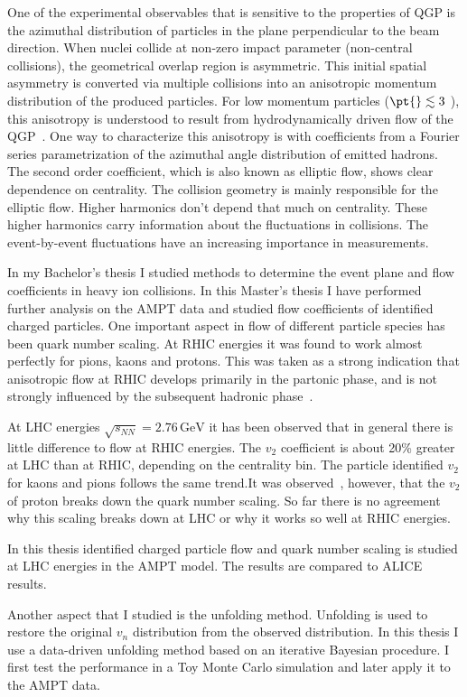 One of the experimental observables that is sensitive to the properties of QGP is the azimuthal distribution of particles in the plane perpendicular to the beam direction. 
When nuclei collide at non-zero impact parameter (non-central collisions), the geometrical overlap region is asymmetric. This initial spatial asymmetry is converted via multiple collisions into an anisotropic momentum distribution of the produced particles. For low momentum particles ($\pt{} \lesssim 3$ \gevc), this anisotropy is understood to result from hydrodynamically driven flow of the QGP~\cite{Adcox:2004mh, Adams:2005dq, Ollitrault:1992, Heinz:2002, Shuryak:2009}. One way to characterize this anisotropy is with coefficients from a Fourier series parametrization of the azimuthal angle distribution of emitted hadrons. The second order coefficient, which is also known as elliptic flow, shows clear dependence on centrality. The collision geometry is mainly responsible for the elliptic flow. Higher harmonics don't depend that much on centrality. These higher harmonics carry information about the fluctuations in collisions. The event-by-event fluctuations have an increasing importance in measurements. 

In my Bachelor's thesis I  studied methods to determine the event plane and flow coefficients in heavy ion collisions. In this Master's thesis I have performed further analysis on the AMPT data and studied flow coefficients of identified charged particles. One important aspect in flow of different particle species has been quark number scaling. At RHIC energies it was found to work almost perfectly for pions, kaons and protons. This was taken as a strong indication that anisotropic flow at RHIC develops primarily in the partonic phase, and is not strongly influenced by the subsequent hadronic phase~\cite{Lacey:2012ma}. 

At LHC energies  $\sqrt{s_{NN}}=2.76\,\mathrm{GeV}$ it has been observed that in general there is little difference to flow at RHIC energies. The $v_2$ coefficient is about 20\% greater at LHC than at RHIC, depending on the centrality bin. 
The particle identified $v_2$ for kaons and pions follows the same trend.It was
observed~\cite{Lacey:2012ma}, however, that the $v_2$ of proton breaks down the quark number
scaling. So far there is no agreement why this scaling breaks down at LHC or why it works so well at RHIC energies.

 In this thesis identified charged particle flow and quark number scaling is studied at LHC energies in the AMPT model. The results are compared to ALICE results.

Another aspect that I studied is the unfolding method. Unfolding is used to restore the original $v_n$ distribution from the observed distribution. In this thesis I use a data-driven unfolding method based on an iterative Bayesian procedure. I first test the performance in a Toy Monte Carlo simulation and later apply it to the AMPT data.
